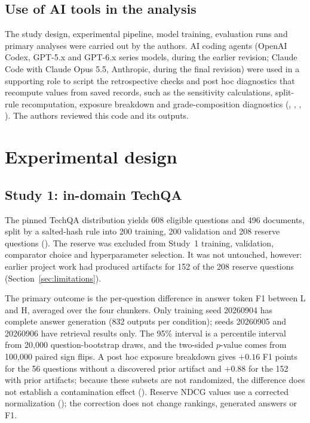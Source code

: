 \subsection{Use of AI tools in the analysis}
The study design, experimental pipeline, model training, evaluation runs and primary analyses were carried out by the authors. AI coding agents (OpenAI Codex, GPT-5.x and GPT-6.x series models, during the earlier revision; Claude Code with Claude Opus 5.5, Anthropic, during the final revision) were used in a supporting role to script the retrospective checks and post hoc diagnostics that recompute values from saved records, such as the sensitivity calculations, split-rule recomputation, exposure breakdown and grade-composition diagnostics (, , , ). The authors reviewed this code and its outputs.

\section{Experimental design}
\subsection{Study 1: in-domain TechQA}
The pinned TechQA distribution yields 608 eligible questions and 496 documents, split by a salted-hash rule into 200 training, 200 validation and 208 reserve questions (). The reserve was excluded from Study~1 training, validation, comparator choice and hyperparameter selection. It was not untouched, however: earlier project work had produced artifacts for 152 of the 208 reserve questions (Section~\ref{sec:limitations}).

The primary outcome is the per-question difference in answer token F1 between L and H, averaged over the four chunkers. Only training seed 20260904 has complete answer generation (832 outputs per condition); seeds 20260905 and 20260906 have retrieval results only. The 95\% interval is a percentile interval from 20,000 question-bootstrap draws, and the two-sided $p$-value comes from 100,000 paired sign flips. A post hoc exposure breakdown gives $+0.16$ F1 points for the 56 questions without a discovered prior artifact and $+0.88$ for the 152 with prior artifacts; because these subsets are not randomized, the difference does not establish a contamination effect (). Reserve NDCG values use a corrected normalization (); the correction does not change rankings, generated answers or F1.

